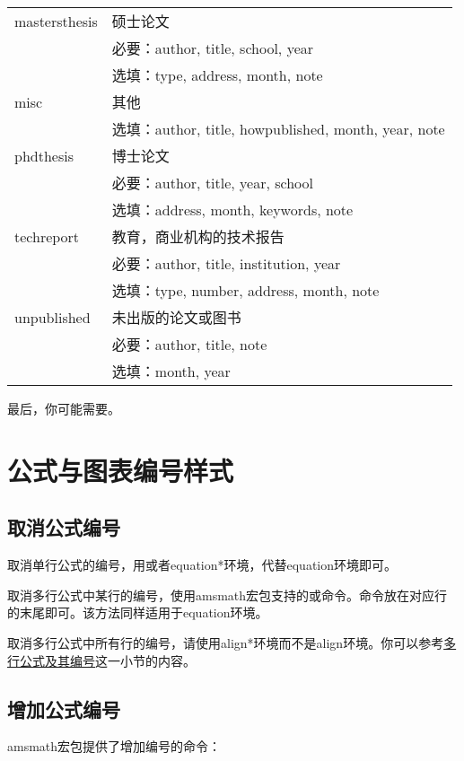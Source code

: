 \begin{table}[!htb]
\begin{tabular}{>{\ttfamily}ll}
\hline
mastersthesis & 硕士论文\\
& 必要：author, title, school, year \\
& 选填：type, address, month, note\\
\hline
misc & 其他 \\
& 选填：author, title, howpublished, month, year, note \\
\hline
phdthesis & 博士论文 \\
& 必要：author, title, year, school\\
& 选填：address, month, keywords, note\\
\hline
techreport & 教育，商业机构的技术报告\\
& 必要：author, title, institution, year\\
& 选填：type, number, address, month, note\\
\hline
unpublished & 未出版的论文或图书\\
& 必要：author, title, note\\
& 选填：month, year\\
\hline
\end{tabular}
\end{table}

最后，你可能需要。

\section{公式与图表编号样式}
\subsection{取消公式编号}
取消单行公式的编号，用\latexline{\\[\\]}或者equation*环境，代替equation环境即可。

取消多行公式中某行的编号，使用amsmath宏包支持的\latexline{\\notag}或\latexline{\\nonumber}命令。命令放在对应行的末尾即可。该方法同样适用于equation环境。

取消多行公式中所有行的编号，请使用align*环境而不是align环境。你可以参考\hyperref[subsec:multieqnum]{多行公式及其编号}这一小节的内容。

\subsection{增加公式编号}
amsmath宏包提供了增加编号的\latexline{\\tag}命令：

